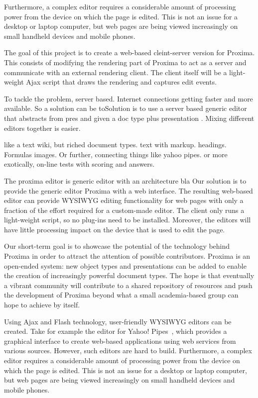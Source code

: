 \documentclass[10pt]{article}
\begin{document}
Furthermore, a complex editor requires a considerable amount of processing power from the device on which the page is edited. This is not an issue for a desktop or laptop computer, but web pages are being viewed increasingly on small handheld devices and mobile phones. 

\bc
The goal of this project is to create a web-based cleint-server version for Proxima. This consists of modifying the rendering part of Proxima to act as a server and communicate with an external rendering client. The client itself will be  a light-weight Ajax script that draws the rendering and captures edit events.  
\ec

To tackle the problem, server based. Internet connections getting faster and more available. So a solution can be toSolution is to use a server based generic editor that abstracts from pres and given a doc type plus presentation . Mixing different editors together is easier.


like a text wiki, but riched document types. text with markup. headings. Formulas images. Or further, connecting things like yahoo pipes. or more exotically, on-line tests with scoring and answers.


The proxima editor is generic editor with an architecture bla Our solution is to provide the generic editor Proxima with a web interface. The resulting web-based editor can provide WYSIWYG editing functionality for web pages with only a fraction of the effort required for a custom-made editor. The client only runs a light-weight script, so no plug-ins need to be installed. Moreover, the editors will have little processing impact on the device that is used to edit the page. 


Our short-term goal is to showcase the potential of the technology behind Proxima in order to attract the attention of possible contributors. Proxima is an open-ended system: new object types and presentations can be added to enable the creation of increasingly powerful document types. The hope is that eventually a vibrant community will contribute to a shared repository of resources and push the development of Proxima beyond what a small academia-based group can hope to achieve by itself.


\bc

Using Ajax and Flash technology, user-friendly WYSIWYG editors can be created. Take for example the editor for Yahoo! Pipes~\cite{yahoo08pipes}, which provides a graphical interface to create web-based applications using web services from various sources. However, such editors are hard to build. Furthermore, a complex editor requires a considerable amount of processing power from the device on which the page is edited. This is not an issue for a desktop or laptop computer, but web pages are being viewed increasingly on small handheld devices and mobile phones. 
\end{document}
